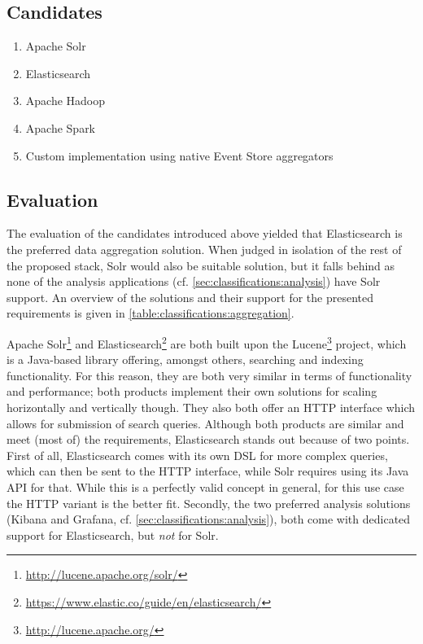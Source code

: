 \subsection{Candidates}

\begin{enumerate}
\item Apache Solr
\item Elasticsearch
\item Apache Hadoop
\item Apache Spark
\item Custom implementation using native Event Store aggregators
\end{enumerate}

\subsection{Evaluation}


The evaluation of the candidates introduced above yielded that Elasticsearch is the preferred data aggregation solution.
When judged in isolation of the rest of the proposed stack, Solr would also be suitable solution, but it falls behind as none of the analysis applications (cf. \cref{sec:classifications:analysis}) have Solr support.
An overview of the solutions and their support for the presented requirements is given in \cref{table:classifications:aggregation}.

Apache Solr\footnote{\url{http://lucene.apache.org/solr/}} and Elasticsearch\footnote{\url{https://www.elastic.co/guide/en/elasticsearch/}} are both built upon the Lucene\footnote{\url{http://lucene.apache.org/}} project, which is a Java-based library offering, amongst others, searching and indexing functionality.
For this reason, they are both very similar in terms of functionality and performance; both products implement their own solutions for scaling horizontally and vertically though.
They also both offer an HTTP interface which allows for submission of search queries.
Although both products are similar and meet (most of) the requirements, Elasticsearch stands out because of two points. 
First of all, Elasticsearch comes with its own \ac{DSL} for more complex queries, which can then be sent to the HTTP interface, while Solr requires using its Java API for that.
While this is a perfectly valid concept in general, for this use case the HTTP variant is the better fit.
Secondly, the two preferred analysis solutions (Kibana and Grafana, cf. \cref{sec:classifications:analysis}), both come with dedicated support for Elasticsearch, but \emph{not} for Solr.

